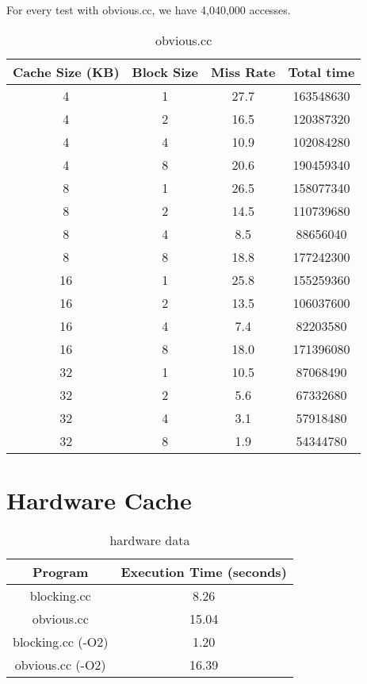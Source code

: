 \documentclass[letterpaper, 12pt, oneside]{memoir}
\begin{document}
For every test with obvious.cc, we have 4,040,000 accesses.
\begin{table}[H]
\centering
\begin{tabular}{c|c|c|c}
    Cache Size (KB)  & Block Size & Miss Rate & Total time \\ \hline 
    4  & 1 & 27.7   & 163548630 \\
    4  & 2 & 16.5   & 120387320 \\
    4  & 4 & 10.9   & 102084280 \\
    4  & 8 & 20.6   & 190459340 \\ \hline
    8  & 1 & 26.5   & 158077340 \\
    8  & 2 & 14.5   & 110739680 \\
    8  & 4 & 8.5    & 88656040 \\
    8  & 8 & 18.8   & 177242300 \\ \hline
    16 & 1 & 25.8   & 155259360 \\
    16 & 2 & 13.5   & 106037600 \\
    16 & 4 & 7.4    & 82203580 \\
    16 & 8 & 18.0   & 171396080 \\ \hline
    32 & 1 & 10.5   & 87068490 \\
    32 & 2 & 5.6    & 67332680 \\
    32 & 4 & 3.1    & 57918480 \\
    32 & 8 & 1.9    & 54344780 \\
\end{tabular}
\caption{obvious.cc}
\end{table}


\section{Hardware Cache}

\begin{table}[H]
\centering
\begin{tabular}{c|c}
    Program & Execution Time (seconds) \\ \hline
    blocking.cc        & 8.26 \\
    obvious.cc         & 15.04 \\
    blocking.cc (-O2)  & 1.20 \\
    obvious.cc  (-O2)  & 16.39
\end{tabular}
\caption{hardware data}
\end{table}
\end{document}
